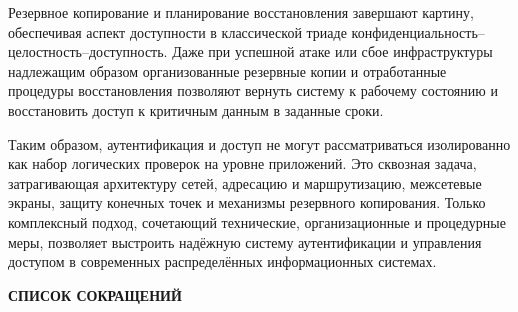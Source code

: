 \documentclass{SibFU-docs}
\begin{document}
Резервное копирование и планирование восстановления завершают картину, обеспечивая аспект доступности в классической триаде конфиденциальность--целостность--доступность. Даже при успешной атаке или сбое инфраструктуры надлежащим образом организованные резервные копии и отработанные процедуры восстановления позволяют вернуть систему к рабочему состоянию и восстановить доступ к критичным данным в заданные сроки.

Таким образом, аутентификация и доступ не могут рассматриваться изолированно как набор логических проверок на уровне приложений. Это сквозная задача, затрагивающая архитектуру сетей, адресацию и маршрутизацию, межсетевые экраны, защиту конечных точек и механизмы резервного копирования. Только комплексный подход, сочетающий технические, организационные и процедурные меры, позволяет выстроить надёжную систему аутентификации и управления доступом в современных распределённых информационных системах.

\newpage
\begin{center}\textbf{СПИСОК СОКРАЩЕНИЙ}\end{center}
{}

\vspace{1em}
\end{document}
